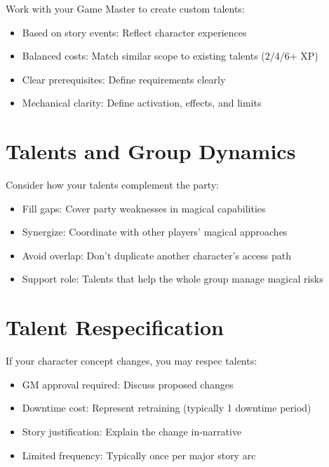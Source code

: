 \documentclass[11pt,twoside,openany]{book}
\begin{document}
Work with your Game Master to create custom talents:
\begin{itemize}
\item Based on story events: Reflect character experiences
\item Balanced costs: Match similar scope to existing talents (2/4/6+ XP)
\item Clear prerequisites: Define requirements clearly
\item Mechanical clarity: Define activation, effects, and limits
\end{itemize}

\section*{Talents and Group Dynamics} 

Consider how your talents complement the party:
\begin{itemize}
\item Fill gaps: Cover party weaknesses in magical capabilities
\item Synergize: Coordinate with other players' magical approaches
\item Avoid overlap: Don't duplicate another character's access path
\item Support role: Talents that help the whole group manage magical risks
\end{itemize}

\section*{Talent Respecification} 

If your character concept changes, you may respec talents:
\begin{itemize}
\item GM approval required: Discuss proposed changes
\item Downtime cost: Represent retraining (typically 1 downtime period)
\item Story justification: Explain the change in-narrative
\item Limited frequency: Typically once per major story arc
\end{itemize}
\end{document}
